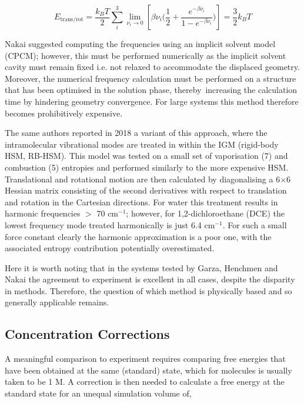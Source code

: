 \documentclass[../main.tex]{subfiles}
\begin{document}
\begin{equation}
E_\text{trans/rot} = \frac{k_B T}{2} \sum_i^3 \lim\limits_{\nu_i \rightarrow 0} \left[ {\beta\nu_i} {\Big (} \frac{1}{2} + \frac{e^{-\beta\nu_i}}{1-e^{-\beta\nu_i}} {\Big )}\right] = \frac{3}{2} k_B T
\end{equation} 

Nakai suggested computing the frequencies using an implicit solvent model (CPCM); however, this must be performed numerically as the implicit solvent cavity must remain fixed i.e. not relaxed to accommodate the displaced geometry. Moreover, the numerical frequency calculation must be performed on a structure that has been optimised in the solution phase, thereby increasing the calculation time by hindering geometry convergence. For large systems this method therefore becomes prohibitively expensive.


The same authors reported in 2018 a variant of this approach,\cite{Tarumi2018} where the intramolecular vibrational modes are treated in within the IGM (rigid-body HSM, RB-HSM). This model was tested on a small set of vaporisation (7) and combustion (5) entropies and performed similarly to the more expensive HSM. Translational and rotational motion are then calculated by diagonalising a 6$\times$6 Hessian matrix consisting of the second derivatives with respect to translation and rotation in the Cartesian directions. For water this treatment results in harmonic frequencies $>$ 70 cm$^{-1}$; however, for 1,2-dichloroethane (DCE) the lowest frequency mode treated harmonically is just 6.4 cm$^{-1}$. For such a small force constant clearly the harmonic approximation is a poor one, with the associated entropy contribution potentially overestimated.

Here it is worth noting that in the systems tested by Garza, Henchmen and Nakai the agreement to experiment is excellent in all cases, despite the disparity in methods. Therefore, the question of which method is physically based and so generally applicable remains.

\subsection{Concentration Corrections}

A meaningful comparison to experiment requires comparing free energies that have been obtained at the same (standard) state, which for molecules is usually taken to be 1 M. A correction is then needed to calculate a free energy at the standard state for an unequal simulation volume of,\cite{General2010} 
\end{document}
